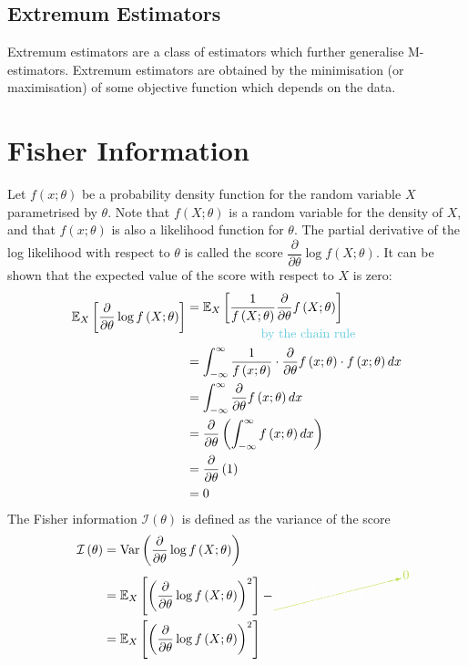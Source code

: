 \documentclass[11pt]{report} %
\begin{document}
\subsection{Extremum Estimators}

Extremum estimators are a class of estimators which further generalise M-estimators. Extremum estimators are obtained by the minimisation (or maximisation) of some objective function which depends on the data.

\section{Fisher Information}

Let $f\left(x;\theta\right)$ be a probability density function for the random variable $X$ parametrised by $\theta$. Note that $f\left(X; \theta\right)$ is a random variable for the density of $X$, and that $f\left(x;\theta\right)$ is also a likelihood function for $\theta$. The partial derivative of the log likelihood with respect to $\theta$ is called the score $\dfrac{\partial}{\partial \theta}\log f\left(X;\theta\right)$. It can be shown that the expected value of the score with respect to $X$ is zero:
\begin{align}
\mathbb{E}_{X}\left[\dfrac{\partial}{\partial \theta}\log f\left(X;\theta\right)\right] & \begin{multlined}= \mathbb{E}_{X}\left[\dfrac{1}{f\left(X;\theta\right)}\dfrac{\partial}{\partial \theta}f\left(X;\theta\right)\right] \\
\text{\blue by the chain rule\black}
\end{multlined} \\
&= \int_{-\infty}^{\infty}\dfrac{1}{f\left(x;\theta\right)}\cdot\dfrac{\partial}{\partial \theta}f\left(x;\theta\right)\cdot f\left(x;\theta\right) dx \\
&= \int_{-\infty}^{\infty}\dfrac{\partial}{\partial \theta}f\left(x;\theta\right) dx \\
&= \dfrac{\partial}{\partial \theta}\left(\int_{-\infty}^{\infty}f\left(x;\theta\right) dx\right) \\
&= \dfrac{\partial}{\partial \theta}\left(1\right) \\
&= 0
\end{align}
The Fisher information $\mathcal{I}\left(\theta\right)$ is defined as the variance of the score
\begin{align}
\mathcal{I}\left(\theta\right) &= \operatorname{Var}\left(\dfrac{\partial}{\partial \theta}\log f\left(X;\theta\right)\right) \\
&= \mathbb{E}_{X}\left[\left(\dfrac{\partial}{\partial \theta}\log f\left(X;\theta\right)\right)^{2}\right] - \green\cancelto{0}{\black\mathbb{E}_{X}\left[\dfrac{\partial}{\partial \theta}\log f\left(X;\theta\right)\right]^{2}} \\
&= \mathbb{E}_{X}\left[\left(\dfrac{\partial}{\partial \theta}\log f\left(X;\theta\right)\right)^{2}\right]
\end{align}
\end{document}
